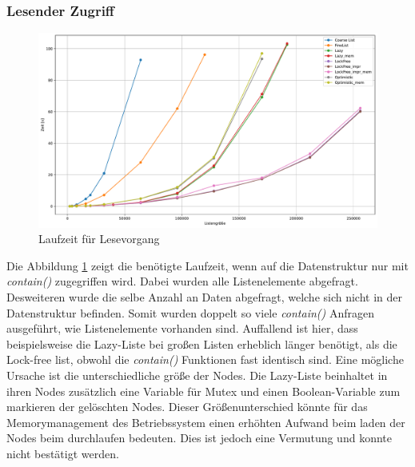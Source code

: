 \subsubsection{Lesender Zugriff}
\begin{figure}[ht!]
	\centering
	\includegraphics[width=1.0\linewidth]{./plots_pdf/check_time} 
	\caption{Laufzeit für Lesevorgang}
	\label{fig:check_time} 
\end{figure}
Die Abbildung \ref{fig:check_time} zeigt die benötigte Laufzeit, wenn auf die Datenstruktur nur mit \textit{contain()} zugegriffen wird.
Dabei wurden alle Listenelemente abgefragt. Desweiteren wurde die selbe Anzahl an Daten abgefragt, welche sich nicht in der Datenstruktur befinden.
Somit wurden doppelt so viele \textit{contain()} Anfragen ausgeführt, wie Listenelemente vorhanden sind.
Auffallend ist hier, dass beispielsweise die Lazy-Liste bei großen Listen erheblich länger benötigt, als die Lock-free list, obwohl die
\textit{contain()} Funktionen fast identisch sind. Eine mögliche Ursache ist die unterschiedliche größe der Nodes. Die Lazy-Liste beinhaltet
in ihren Nodes zusätzlich eine Variable für Mutex und einen Boolean-Variable zum markieren der gelöschten Nodes. Dieser Größenunterschied könnte für das
Memorymanagement des Betriebssystem einen erhöhten Aufwand beim laden der Nodes beim durchlaufen bedeuten. Dies ist jedoch eine Vermutung
und konnte nicht bestätigt werden.


